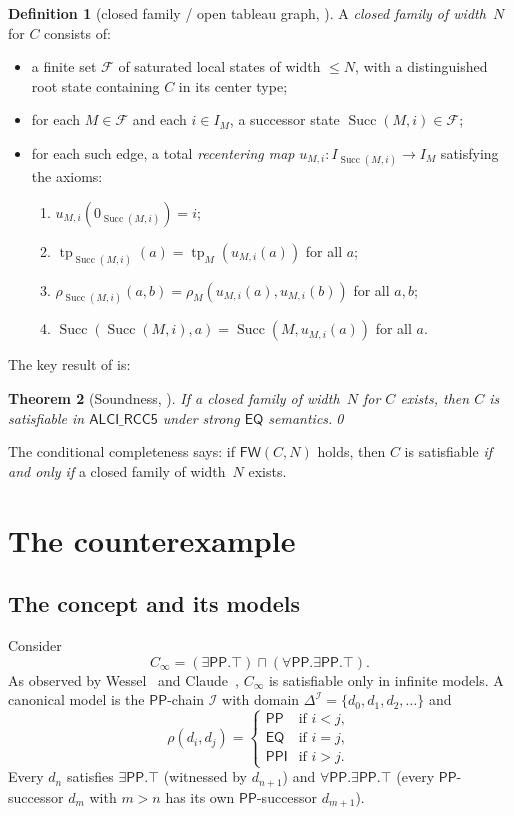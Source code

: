 \documentclass[11pt]{article}
\newtheorem{theorem}{Theorem}[section]
\theoremstyle{definition}
\newtheorem{definition}[theorem]{Definition}
\newcommand{\ALCIRCC}{\mathsf{ALCI\_RCC5}}
\newcommand{\tp}{\operatorname{tp}}
\newcommand{\Eq}{\mathsf{EQ}}
\newcommand{\Pp}{\mathsf{PP}}
\newcommand{\Ppi}{\mathsf{PPI}}
\newcommand{\Succ}{\operatorname{Succ}}
\begin{document}
\begin{definition}[closed family / open tableau graph, ]
A \emph{closed family of width~$N$} for $C$ consists of:
\begin{itemize}
\item a finite set $\mathcal{F}$ of saturated local states of width
  $\le N$, with a distinguished root state containing $C$ in its
  center type;
\item for each $M\in\mathcal{F}$ and each $i\in I_M$, a successor
  state $\Succ(M,i)\in\mathcal{F}$;
\item for each such edge, a total \emph{recentering map}
  $u_{M,i}:I_{\Succ(M,i)}\to I_M$ satisfying the axioms:
  \begin{enumerate}[label=(R\arabic*)]
  \item $u_{M,i}(0_{\Succ(M,i)})=i$;
  \item $\tp_{\Succ(M,i)}(a)=\tp_M(u_{M,i}(a))$ for all $a$;
  \item $\rho_{\Succ(M,i)}(a,b)=\rho_M(u_{M,i}(a),u_{M,i}(b))$ for all $a,b$;
  \item $\Succ(\Succ(M,i),a)=\Succ(M,u_{M,i}(a))$ for all $a$.
  \end{enumerate}
\end{itemize}
\end{definition}

The key result of \cite{GPT2026} is:

\begin{theorem}[Soundness, ]
If a closed family of width~$N$ for $C$ exists, then $C$ is
satisfiable in $\ALCIRCC$ under strong $\Eq$ semantics.\qed
\end{theorem}

The conditional completeness says: if $\mathsf{FW}(C,N)$ holds, then
$C$ is satisfiable \emph{if and only if} a closed family of width~$N$
exists.

\section{The counterexample}\label{sec:counter}

\subsection{The concept and its models}

Consider
\[
C_\infty = (\exists\Pp.\top)\sqcap(\forall\Pp.\exists\Pp.\top).
\]
As observed by Wessel~\cite{Wessel2003} and
Claude~\cite[Remark~2.5]{Claude2026}, $C_\infty$ is satisfiable only
in infinite models.  A canonical model is the $\Pp$-chain
$\mathcal{I}$ with domain $\Delta^{\mathcal{I}}=\{d_0,d_1,d_2,\dots\}$ and
\[
\rho(d_i,d_j) =
\begin{cases}
\Pp & \text{if } i<j,\\
\Eq & \text{if } i=j,\\
\Ppi & \text{if } i>j.
\end{cases}
\]
Every $d_n$ satisfies $\exists\Pp.\top$ (witnessed by $d_{n+1}$) and
$\forall\Pp.\exists\Pp.\top$ (every $\Pp$-successor $d_m$ with $m>n$
has its own $\Pp$-successor $d_{m+1}$).
\end{document}
